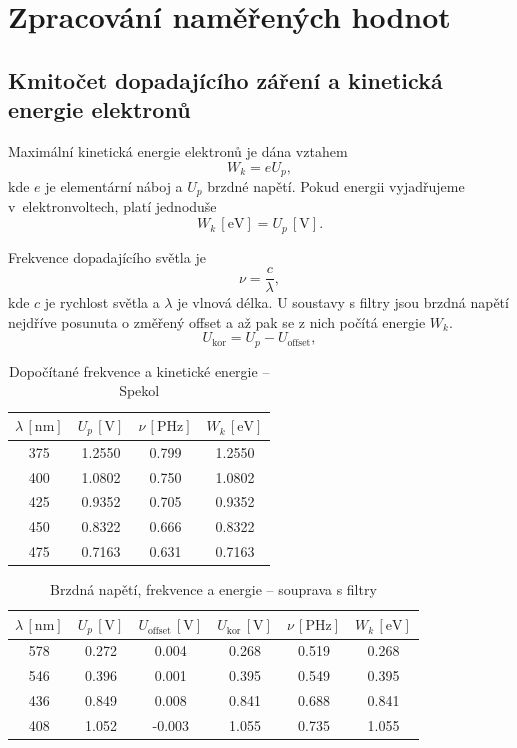 \documentclass[a4paper,12pt]{article}
\begin{document}
\newpage
\section{Zpracování naměřených hodnot}

\subsection{Kmitočet dopadajícího záření a kinetická energie elektronů}

Maximální kinetická energie elektronů je dána vztahem
\[
W_k = e U_p,
\]
kde $e$ je elementární náboj a $U_p$ brzdné napětí. Pokud energii vyjadřujeme
v~elektronvoltech, platí jednoduše
\[
W_k\,[\mathrm{eV}] = U_p\,[\mathrm{V}].
\]

Frekvence dopadajícího světla je
\[
\nu = \frac{c}{\lambda},
\]
kde $c$ je rychlost světla a $\lambda$ je vlnová délka. U soustavy s filtry jsou brzdná napětí nejdříve posunuta o změřený offset a až pak se z nich počítá energie $W_k$.
\[
U_{\text{kor}} = U_p - U_{\text{offset}},
\]

\begin{table}[H]
\centering
\renewcommand{\arraystretch}{1.5}
\begin{tabular}{|c|c|c|c|}
\hline
$\lambda\,[\mathrm{nm}]$ & $U_p\,[\mathrm{V}]$ &
$\nu\,[\mathrm{PHz}]$ & $W_k\,[\mathrm{eV}]$ \\
\hline
375 & 1.2550 & 0.799 & 1.2550 \\
400 & 1.0802 & 0.750 & 1.0802 \\
425 & 0.9352 & 0.705 & 0.9352 \\
450 & 0.8322 & 0.666 & 0.8322 \\
475 & 0.7163 & 0.631 & 0.7163 \\
\hline
\end{tabular}
\caption{Dopočítané frekvence a kinetické energie -- Spekol}
\end{table}

\begin{table}[H]
\centering
\renewcommand{\arraystretch}{1.5}
\begin{tabular}{|c|c|c|c|c|c|}
\hline
$\lambda\,[\mathrm{nm}]$ &
$U_p\,[\mathrm{V}]$ &
$U_{\text{offset}}\,[\mathrm{V}]$ &
$U_{\text{kor}}\,[\mathrm{V}]$ &
$\nu\,[\mathrm{PHz}]$ &
$W_k\,[\mathrm{eV}]$ \\
\hline
578 & 0.272 & 0.004 & 0.268 & 0.519 & 0.268 \\
546 & 0.396 & 0.001 & 0.395 & 0.549 & 0.395 \\
436 & 0.849 & 0.008 & 0.841 & 0.688 & 0.841 \\
408 & 1.052 & -0.003 & 1.055 & 0.735 & 1.055 \\
\hline
\end{tabular}
\caption{Brzdná napětí, frekvence a energie -- souprava s filtry}
\end{table}
\end{document}
